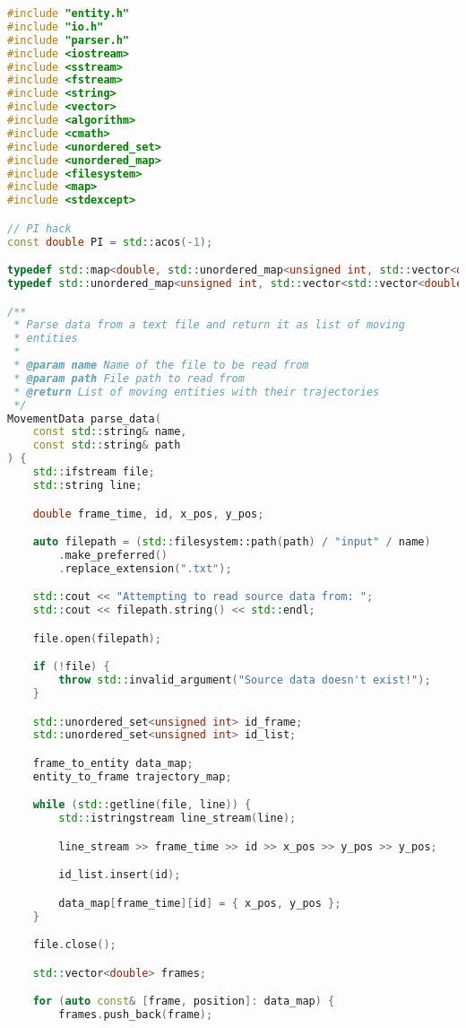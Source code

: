 \begin{lstlisting}[language=C++, caption=Implementasi 
modul \texttt{parser.cpp},label={lamp:module-parser}]
#include "entity.h"
#include "io.h"
#include "parser.h"
#include <iostream>
#include <sstream>
#include <fstream>
#include <string>
#include <vector>
#include <algorithm>
#include <cmath>
#include <unordered_set>
#include <unordered_map>
#include <filesystem>
#include <map>
#include <stdexcept>

// PI hack
const double PI = std::acos(-1);

typedef std::map<double, std::unordered_map<unsigned int, std::vector<double> > > frame_to_entity;
typedef std::unordered_map<unsigned int, std::vector<std::vector<double> > > entity_to_frame;

/**
 * Parse data from a text file and return it as list of moving
 * entities
 * 
 * @param name Name of the file to be read from
 * @param path File path to read from
 * @return List of moving entities with their trajectories
 */
MovementData parse_data(
    const std::string& name,
    const std::string& path
) {
    std::ifstream file;
    std::string line;

    double frame_time, id, x_pos, y_pos;

    auto filepath = (std::filesystem::path(path) / "input" / name)
        .make_preferred()
        .replace_extension(".txt");

    std::cout << "Attempting to read source data from: ";
    std::cout << filepath.string() << std::endl; 

    file.open(filepath);

    if (!file) {
        throw std::invalid_argument("Source data doesn't exist!");
    }

    std::unordered_set<unsigned int> id_frame;
    std::unordered_set<unsigned int> id_list;

    frame_to_entity data_map;
    entity_to_frame trajectory_map;

    while (std::getline(file, line)) {
        std::istringstream line_stream(line);

        line_stream >> frame_time >> id >> x_pos >> y_pos >> y_pos;

        id_list.insert(id);

        data_map[frame_time][id] = { x_pos, y_pos }; 
    }

    file.close();

    std::vector<double> frames;

    for (auto const& [frame, position]: data_map) {
        frames.push_back(frame);
    

\end{lstlisting}
